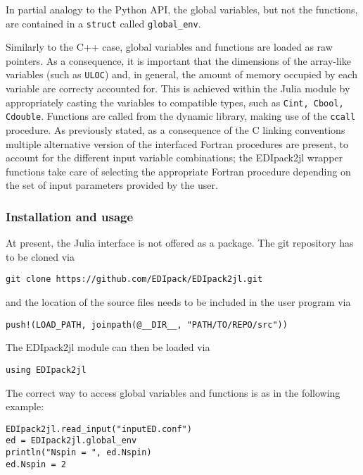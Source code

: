 \documentclass[edipack2.tex]{subfiles}
\begin{document}
In partial analogy to the Python API, the global variables, but not the functions, are contained in a  {\tt struct} called {\tt global\_env}.

Similarly to the C++ case, global variables and functions are loaded as raw pointers. As a consequence, it is important that the dimensions of the array-like variables (such as {\tt ULOC}) and, in general, the amount of memory occupied by each variable are correcty accounted for. This is achieved within the Julia module by appropriately casting the variables to compatible types, such as {\tt  Cint, Cbool, Cdouble}.
Functions are called from the dynamic library, making use of the {\tt  ccall} procedure. As previously stated, as a consequence of the C linking conventions multiple alternative version of the interfaced Fortran procedures are present, to account for the different input variable combinations; the EDIpack2jl wrapper functions take care of selecting the appropriate Fortran procedure depending on the set of input parameters provided by the user.

\subsubsection{Installation and usage}

At present, the \NAME Julia interface is not offered as a package. The git repository has to be cloned via

\begin{lstlisting}[style=mybash]
git clone https://github.com/EDIpack/EDIpack2jl.git
\end{lstlisting}

and the location of the source files needs to be included in the user program via

\begin{lstlisting}[style=mybash]
push!(LOAD_PATH, joinpath(@__DIR__, "PATH/TO/REPO/src"))
\end{lstlisting}

The EDIpack2jl module can then be loaded via

\begin{lstlisting}[style=mybash]
using EDIpack2jl
\end{lstlisting}

The correct way to access global variables and functions is as in the following example:

\begin{lstlisting}[style=mybash]
EDIpack2jl.read_input("inputED.conf")
ed = EDIpack2jl.global_env
println("Nspin = ", ed.Nspin)
ed.Nspin = 2
\end{lstlisting}
\end{document}
